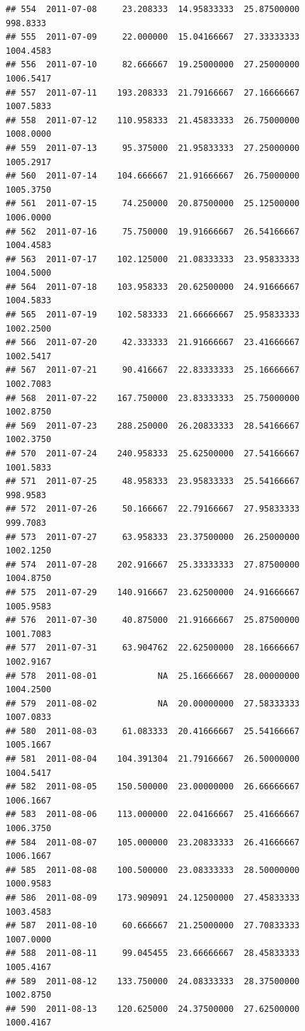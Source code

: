 \documentclass[
]{article}
\begin{document}
\begin{verbatim}
## 554  2011-07-08     23.208333  14.95833333  25.87500000     998.8333
## 555  2011-07-09     22.000000  15.04166667  27.33333333    1004.4583
## 556  2011-07-10     82.666667  19.25000000  27.25000000    1006.5417
## 557  2011-07-11    193.208333  21.79166667  27.16666667    1007.5833
## 558  2011-07-12    110.958333  21.45833333  26.75000000    1008.0000
## 559  2011-07-13     95.375000  21.95833333  27.25000000    1005.2917
## 560  2011-07-14    104.666667  21.91666667  26.75000000    1005.3750
## 561  2011-07-15     74.250000  20.87500000  25.12500000    1006.0000
## 562  2011-07-16     75.750000  19.91666667  26.54166667    1004.4583
## 563  2011-07-17    102.125000  21.08333333  23.95833333    1004.5000
## 564  2011-07-18    103.958333  20.62500000  24.91666667    1004.5833
## 565  2011-07-19    102.583333  21.66666667  25.95833333    1002.2500
## 566  2011-07-20     42.333333  21.91666667  23.41666667    1002.5417
## 567  2011-07-21     90.416667  22.83333333  25.16666667    1002.7083
## 568  2011-07-22    167.750000  23.83333333  25.75000000    1002.8750
## 569  2011-07-23    288.250000  26.20833333  28.54166667    1002.3750
## 570  2011-07-24    240.958333  25.62500000  27.54166667    1001.5833
## 571  2011-07-25     48.958333  23.95833333  25.54166667     998.9583
## 572  2011-07-26     50.166667  22.79166667  27.95833333     999.7083
## 573  2011-07-27     63.958333  23.37500000  26.25000000    1002.1250
## 574  2011-07-28    202.916667  25.33333333  27.87500000    1004.8750
## 575  2011-07-29    140.916667  23.62500000  24.91666667    1005.9583
## 576  2011-07-30     40.875000  21.91666667  25.87500000    1001.7083
## 577  2011-07-31     63.904762  22.62500000  28.16666667    1002.9167
## 578  2011-08-01            NA  25.16666667  28.00000000    1004.2500
## 579  2011-08-02            NA  20.00000000  27.58333333    1007.0833
## 580  2011-08-03     61.083333  20.41666667  25.54166667    1005.1667
## 581  2011-08-04    104.391304  21.79166667  26.50000000    1004.5417
## 582  2011-08-05    150.500000  23.00000000  26.66666667    1006.1667
## 583  2011-08-06    113.000000  22.04166667  25.41666667    1006.3750
## 584  2011-08-07    105.000000  23.20833333  26.41666667    1006.1667
## 585  2011-08-08    100.500000  23.08333333  28.50000000    1000.9583
## 586  2011-08-09    173.909091  24.12500000  27.45833333    1003.4583
## 587  2011-08-10     60.666667  21.25000000  27.70833333    1007.0000
## 588  2011-08-11     99.045455  23.66666667  28.45833333    1005.4167
## 589  2011-08-12    133.750000  24.08333333  28.37500000    1002.8750
## 590  2011-08-13    120.625000  24.37500000  27.62500000    1000.4167

\end{verbatim}
\end{document}
